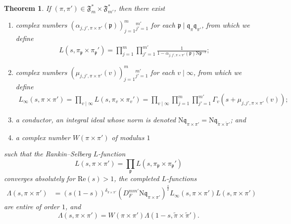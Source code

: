 \documentclass[12pt,reqno]{amsart}
\newtheorem{thm}{Theorem}[section]
\theoremstyle{remark}
\renewcommand{\Re}{\mathrm{Re}}
\newcommand{\N}{\mathrm{N}}
\newcommand{\kp}{\mathfrak{p}}
\newcommand{\kq}{\mathfrak{q}}
\numberwithin{equation}{section}
\begin{document}
\begin{thm}\cite{JPS}
\label{thm:JPSS}
If $(\pi,\pi')\in\mathfrak{F}_{m}^*\times\mathfrak{F}_{m'}^*$, then there exist
\begin{enumerate}
\item complex numbers $(\alpha_{j,j',\pi\times\pi'}(\kp))_{j=1}^m{}_{j'=1}^{m'}$ for each $\kp  \mid \kq_{\pi}\kq_{\pi'}$, from which we define
	\begin{align*}
	L(s,\pi_{\kp}\times\pi_{\kp}') = \prod_{j=1}^m \prod_{j'=1}^{m'}\frac{1}{1-\alpha_{j,j',\pi\times\pi'}({\kp})\N{\kp}^{-s}}; %
	\end{align*}
\item complex numbers $(\mu_{j,j',\pi\times\pi'}(v))_{j=1}^{m}{}_{j'=1}^{m'}$ for each $v\mid\infty$, from which we define
	\begin{align*}
	L_{\infty}(s,\pi\times\pi') = \prod_{v\mid\infty}L(s,\pi_{v}\times\pi_{v}') = \prod_{v\mid\infty}\prod_{j=1}^m \prod_{j'=1}^{m'}\Gamma_v(s+\mu_{j,j',\pi\times\pi'}(v)); %
	\end{align*}
\item a conductor, an integral ideal whose norm is denoted $\N\kq_{\pi\times\pi'}=\N\kq_{\widetilde{\pi}\times\widetilde{\pi}'}$; and
\item a complex number $W(\pi\times\pi')$ of modulus $1$
\end{enumerate}
such that the Rankin--Selberg $L$-function %
\[
L(s,\pi\times\pi')=\prod_{\kp}L(s,\pi_{\kp}\times\pi_{\kp}')%
\]
converges absolutely for $\Re(s)>1$, the completed $L$-functions
\begin{align}\label{eq:complete-RSL}
\Lambda(s,\pi\times\pi') &= (s(1-s))^{\delta_{\pi\times\pi'}} (D_F^{mm'}\N\kq_{\pi\times\pi'})^{\frac{s}{2}} L_{\infty}(s,\pi\times\pi')L(s,\pi\times\pi') %
\end{align}
are entire of order $1$, and 
\[
\Lambda(s,\pi\times\pi')=W(\pi\times\pi')\Lambda(1-s,\widetilde{\pi}\times\widetilde{\pi}').
\]
\end{thm}
\end{document}
